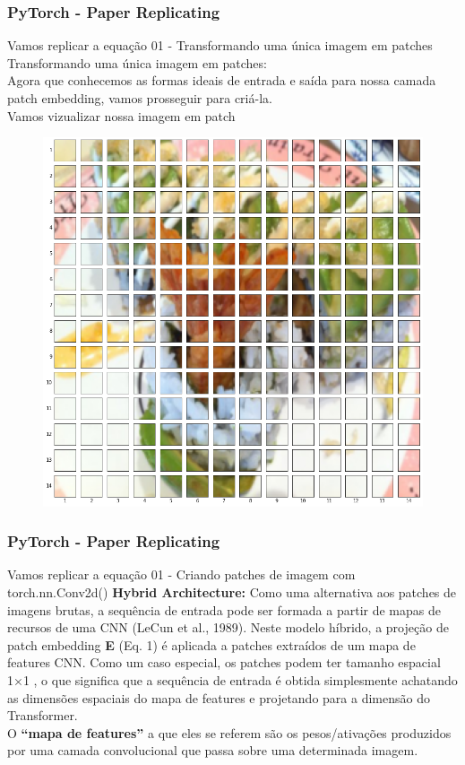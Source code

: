 \documentclass{beamer}
\begin{document}
\begin{frame}
	\frametitle{PyTorch - Paper Replicating}
	\begin{block}{Vamos replicar a equação 01 - Transformando uma única imagem em patches}
		Transformando uma única imagem em patches: \\
		Agora que conhecemos as formas ideais de entrada e saída para nossa camada patch embedding, vamos prosseguir para criá-la. \\
		Vamos vizualizar nossa imagem em patch
		\begin{figure}
			\centering
			\includegraphics[width=0.4\linewidth]{figures/vit_patch_ex01}
		\end{figure}
	\end{block}
\end{frame}
\begin{frame}
	\frametitle{PyTorch - Paper Replicating}
	\begin{block}{Vamos replicar a equação 01 - Criando patches de imagem com torch.nn.Conv2d()}
		\textbf{Hybrid Architecture: }Como uma alternativa aos patches de imagens brutas, a sequência de entrada pode ser formada a partir de mapas de recursos de uma CNN (LeCun et al., 1989). Neste modelo híbrido, a projeção de patch embedding \textbf{E } (Eq. 1) é aplicada a patches extraídos de um mapa de features CNN. Como um caso especial, os patches podem ter tamanho espacial  1×1 , o que significa que a sequência de entrada é obtida simplesmente achatando as dimensões espaciais do mapa de features e projetando para a dimensão do Transformer. \\
		O \textbf{``mapa de features''} a que eles se referem são os pesos/ativações produzidos por uma camada convolucional que passa sobre uma determinada imagem. \\
		\href{https://github.com/mafaldasalomao/pavic_treinamento_ml/blob/main/Machine_Learning/figures/08-vit-paper-patch-embedding-animation.gif?raw=true}{} 
	\end{block}
\end{frame}
\end{document}
